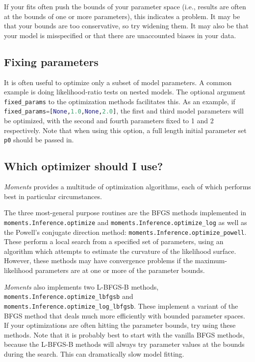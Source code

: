 \documentclass[12pt]{article}
\makeatletter
\newcommand{\py}[1]{\lstinline[language=Python, showstringspaces=False]@#1@}
\makeatother
\begin{document}
If your fits often push the bounds of your parameter space (i.e., results are often at the bounds of one or more parameters), this indicates a problem.
It may be that your bounds are too conservative, so try widening them.
It may also be that your model is misspecified or that there are unaccounted biases in your data.

\subsection{Fixing parameters}

It is often useful to optimize only a subset of model parameters.
A common example is doing likelihood-ratio tests on nested models.
The optional argument \py{fixed_params} to the optimization methods facilitates this.
As an example, if \py{fixed_params=[None,1.0,None,2.0]}, the first and third model parameters will be optimized, with the second and fourth parameters fixed to 1 and 2 respectively.
Note that when using this option, a full length initial parameter set \py{p0} should be passed in.

\subsection{Which optimizer should I use?}\label{sec:which_optimizer}

\textit{Moments} provides a multitude of optimization algorithms, each of which performs best in particular circumstances.

The three most-general purpose routines are the BFGS methods implemented in \py{moments.Inference.optimize} and \py{moments.Inference.optimize_log} as well as the Powell's conjugate direction method: \py{moments.Inference.optimize_powell}.
These perform a local search from a specified set of parameters, using an algorithm which attempts to estimate the curvature of the likelihood surface.
However, these methods may have convergence problems if the maximum-likelihood parameters are at one or more of the parameter bounds.

\textit{Moments} also implements two L-BFGS-B methods, \py{moments.Inference.optimize_lbfgsb} and \py{moments.Inference.optimize_log_lbfgsb}.
These implement a variant of the BFGS method that deals much more efficiently with bounded parameter spaces.
If your optimizations are often hitting the parameter bounds, try using these methods.
Note that it is probably best to start with the vanilla BFGS methods, because the L-BFGS-B methods will always try parameter values at the bounds during the search.
This can dramatically slow model fitting.
\end{document}
